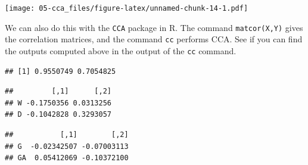 \documentclass[
]{book}
\newenvironment{Shaded}{\begin{snugshade}}{\end{snugshade}}
\newcommand{\CommentTok}[1]{\textcolor[rgb]{0.56,0.35,0.01}{\textit{#1}}}
\newcommand{\FunctionTok}[1]{\textcolor[rgb]{0.00,0.00,0.00}{#1}}
\newcommand{\NormalTok}[1]{#1}
\newcommand{\OtherTok}[1]{\textcolor[rgb]{0.56,0.35,0.01}{#1}}
\newcommand{\SpecialCharTok}[1]{\textcolor[rgb]{0.00,0.00,0.00}{#1}}
\theoremstyle{definition}
\theoremstyle{definition}
\theoremstyle{definition}
\theoremstyle{definition}
\theoremstyle{remark}
\begin{document}
\texttt{[image: 05-cca\_files/figure-latex/unnamed-chunk-14-1.pdf]}

We can also do this with the \texttt{CCA} package in R. The command \texttt{matcor(X,Y)} gives the correlation matrices, and the command \texttt{cc} performs CCA. See if you can find the outputs computed above in the output of the \texttt{cc} command.

\begin{Shaded}
\end{Shaded}

\begin{verbatim}
## [1] 0.9550749 0.7054825
\end{verbatim}

\begin{Shaded}
\end{Shaded}

\begin{verbatim}
##         [,1]      [,2]
## W -0.1750356 0.0313256
## D -0.1042828 0.3293057
\end{verbatim}

\begin{Shaded}
\end{Shaded}

\begin{verbatim}
##           [,1]        [,2]
## G  -0.02342507 -0.07003113
## GA  0.05412069 -0.10372100
\end{verbatim}

\begin{Shaded}
\end{Shaded}
\end{document}
